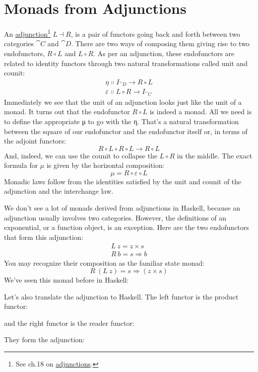 \section{Monads from Adjunctions}

An \hyperref[adjunctions]{adjunction}\footnote{See ch.18 on \hyperref[adjunctions]{adjunctions}.}
$L \dashv R$, is a pair of functors going back and forth between two
categories $\cat{C}$ and $\cat{D}$. There are two ways of composing them
giving rise to two endofunctors, $R \circ L$ and $L \circ R$.
As per an adjunction, these endofunctors are related to identity
functors through two natural transformations called unit and counit:
\begin{gather*}
\eta \Colon I_{\cat{D}} \to R \circ L \\
\varepsilon \Colon L \circ R \to I_{\cat{C}}
\end{gather*}
Immediately we see that the unit of an adjunction looks just like the
unit of a monad. It turns out that the endofunctor $R \circ L$ is
indeed a monad. All we need is to define the appropriate μ to go with
the η. That's a natural transformation between the square of our
endofunctor and the endofunctor itself or, in terms of the adjoint
functors:
\[R \circ L \circ R \circ L \to R \circ L\]
And, indeed, we can use the counit to collapse the $L \circ R$ in
the middle. The exact formula for $\mu$ is given by the horizontal
composition:
\[\mu = R \circ \varepsilon \circ L\]
Monadic laws follow from the identities satisfied by the unit and counit
of the adjunction and the interchange law.

We don't see a lot of monads derived from adjunctions in Haskell,
because an adjunction usually involves two categories. However, the
definitions of an exponential, or a function object, is an exception.
Here are the two endofunctors that form this adjunction:
\begin{gather*}
L\ z = z\times{}s \\
R\ b = s \Rightarrow b
\end{gather*}
You may recognize their composition as the familiar state monad:
\[R\ (L\ z) = s \Rightarrow (z\times{}s)\]
We've seen this monad before in Haskell:

Let's also translate the adjunction to Haskell. The left functor is the
product functor:

and the right functor is the reader functor:

They form the adjunction:


